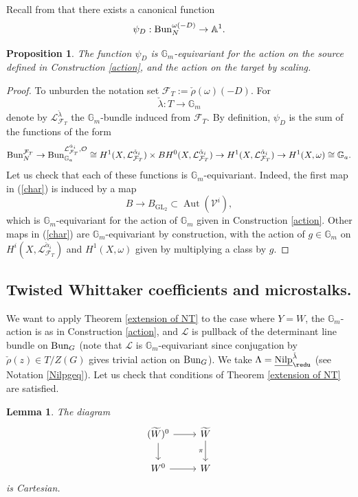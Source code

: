 \documentclass[9pt]{amsart}
\newcommand{\bA}{{\mathbb A}}
\newcommand{\bG}{{\mathbb G}}
\newcommand{\cF}{{\mathcal F}}
\newcommand{\cL}{{\mathcal L}}
\newcommand{\cO}{{\mathcal O}}
\newcommand{\cV}{{\mathcal V}}
\DeclareMathOperator{\Aut}{{Aut}}
\DeclareMathOperator{\Nilp}{{Nilp}} \DeclareMathOperator{\op}{{op}}
\DeclareMathOperator{\GL}{{GL}}
\newtheorem{pr}[subsubsection]{Proposition}
\newtheorem{lm}[subsubsection]{Lemma}
\numberwithin{equation}{section}
\begin{document}
Recall from \cite[4.1.3]{FGV} that there exists a canonical function
$$\psi_D: \Bun_N^{\omega(-D)} \rightarrow \bA^1.$$

\begin{pr}
	The function $\psi_D$ is $\bG_m$-equivariant for the action on the source defined in Construction \ref{action}, and the action on the target by scaling. 
\end{pr}

\begin{proof}
	To unburden the notation set $\cF_T:= \check{\rho}(\omega)(-D).$ For $$\check{\lambda}: T \rightarrow \bG_m$$
	denote by $\cL_{\cF_T}^{\check{\lambda}}$ the $\bG_m$-bundle induced from $\cF_T$. By definition, $\psi_D$ is the sum of the functions of the form
	\begin{equation}\label{char}
		\Bun_N^{\cF_T} \rightarrow \Bun_{\bG_a}^{\cL_{\cF_T}^{\check{\alpha}_i}, \cO} \cong H^1(X, \cL_{\cF_T}^{\check{\alpha}_i}) \times BH^0(X, \cL_{\cF_T}^{\check{\alpha}_i}) \rightarrow H^1(X, \cL_{\cF_T}^{\check{\alpha}_i}) \rightarrow H^1(X, \omega) \cong \bG_a.
	\end{equation}
	Let us check that each of these functions is $\bG_m$-equivariant. Indeed, the first map in (\ref{char}) is induced by a map $$B \rightarrow B_{\GL_2} \subset \Aut(\cV^i),$$
	which is $\bG_m$-equivariant for the action of $\bG_m$ given in Construction \ref{action}. Other maps in (\ref{char}) are $\bG_m$-equivariant by construction, with the action of $g \in \bG_m$ on $H^i(X, \cL_{\cF_T}^{\check{\alpha}_i})$ and $H^1(X, \omega)$ given by multiplying a class by $g$. 
	
\end{proof}

\subsection{Twisted Whittaker coefficients and microstalks.}
We want to apply Theorem \ref{extension of NT} to the case where $Y = W$, the $\bG_m$-action is as in Construction \ref{action}, and $\cL$ is pullback of the determinant line bundle on $\operatorname{{Bun}}_G$ (note that $\cL$ is $\bG_m$-equivariant since conjugation by  $\check{\rho}(z) \in T/Z(G)$ gives trivial action on $\operatorname{{Bun}}_G$). We take $\Lambda = \underline{\Nilp}_{\redu}^{\check{\lambda}}$ (see Notation \ref{Nilpgeq}). Let us check that conditions of Theorem \ref{extension of NT} are satisfied. 

\begin{lm}\label{W}
	The diagram 	\[
	\begin{tikzcd}
	(\widetilde{W})^{0}\ar[r, rightarrow, ""']\ar[d, rightarrow, ""']&   	\widetilde{W}\ar[d, rightarrow, "\pi"']  \\
	W^{0}\ar[r, rightarrow, ""']&   W
	\end{tikzcd}
	\]
	is Cartesian.
\end{lm}
\end{document}
